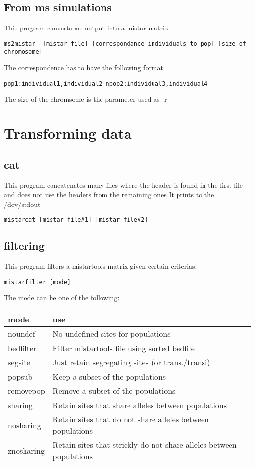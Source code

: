 \documentclass[a4paper]{article}
\begin{document}
\subsection{From ms simulations}
This program converts ms output into a mistar matrix

\small
\begin{verbatim}
ms2mistar  [mistar file] [correspondance individuals to pop] [size of chromosome]
\end{verbatim}
\normalsize

The correspondence has to have the following format
\begin{verbatim}
pop1:individual1,individual2-npop2:individual3,individual4
\end{verbatim}
The size of the chromsome is the parameter used as -r

\section{Transforming data}
\subsection{cat }
This program concatenates many files where the header is found in the
first file and does not use the headers from the remaining ones
It prints to the /dev/stdout
\begin{verbatim}
mistarcat [mistar file#1] [mistar file#2]
\end{verbatim}


\subsection{filtering}

This program filters a mistartools matrix given certain criterias.

\begin{verbatim}
mistarfilter [mode]
\end{verbatim}

The mode can be one of the following:

\begin{tabular}{ll}
\hline
mode & use \\
\hline
noundef      &   No undefined sites for populations \\
bedfilter    &   Filter mistartools file using sorted bedfile \\
segsite      &   Just retain segregating sites (or trans./transi) \\
popsub       &   Keep a subset of the populations \\
removepop    &   Remove a subset of the populations \\
sharing      &   Retain sites that share alleles between populations \\
nosharing    &   Retain sites that do not share alleles between populations \\
znosharing   &   Retain sites that strickly do not share alleles between populations \\
\end{tabular}
\end{document}
